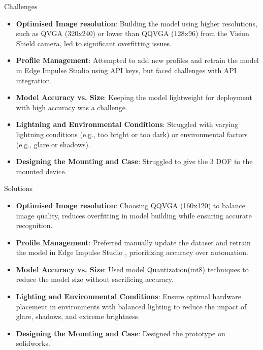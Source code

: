 \begin{frame}{Challenges}
	\begin{block}{}
		\begin{itemize}
			\item \textbf{Optimised Image resolution}: Building the model using higher resolutions, such as QVGA (320x240) or lower than QQVGA (128x96) from the Vision Shield camera, led to significant overfitting issues.
			
			\item \textbf{Profile Management}: Attempted to add new profiles and retrain the model in Edge Impulse Studio  using API keys, but faced challenges with API integration.
			
			\item \textbf{Model Accuracy vs. Size}: Keeping the model lightweight for deployment with high accuracy was a challenge.
			
			\item \textbf{Lightning and Environmental Conditions}: Struggled with varying lightning conditions (e.g., too bright or too dark) or environmental factors (e.g., glare or shadows).
			
			\item \textbf{Designing the Mounting and Case}: Struggled to give the 3 DOF to the mounted device.
			
		\end{itemize} 
		
	\end{block}
\end{frame}

\begin{frame}{Solutions}
	
	
	\begin{block}{}
		\begin{itemize}
			\item \textbf{Optimised Image resolution}: Choosing QQVGA (160x120) to balance image quality, reduces overfitting in model building while ensuring accurate recognition.
			
			\item \textbf{Profile Management}: Preferred manually update the dataset and retrain the model in Edge Impulse Studio \cite{edgeimpulse:2025}, prioritizing accuracy over automation.
			
			\item \textbf{Model Accuracy vs. Size}: Used model Quantization(int8) \cite{mathworksint8quantization:2025} techniques to reduce the model size without sacrificing accuracy.
			
			\item \textbf{Lighting and Environmental Conditions}: Ensure optimal hardware placement in environments with balanced lighting to reduce the impact of glare, shadows, and extreme brightness.
			
			\item \textbf{Designing the Mounting and Case}: Designed the prototype on solidworks.
			
		\end{itemize}
		
	\end{block}	
\end{frame}		

